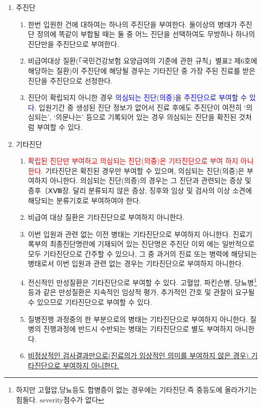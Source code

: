 \begin{tcolorbox}[frogbox,title=주진단과 기타진단에 대한이해]
\begin{enumerate}[가.]\tightlist
\item 주진단
	\begin{enumerate}[(1)]\tightlist
	\item 한번 입원한 건에 대하여는 하나의 주진단을 부여한다. 둘이상의 병태가 주진단 정의에 똑같이 부합될 때는 둘 중 어느 진단을 선택하여도 무방하나 하나의 진단만을 주진단으로 부여한다.
	\item 비급여대상 질환(「국민건강보험 요양급여의 기준에 관한 규칙」별표2 제6호에 해당하는 질환)이 주진단에 해당될 경우는 기타진단 중 가장 주된 진료를 받은 진단을 주진단으로 선정한다.
	\item 진단이 확립되지 아니한 경우 \textcolor{blue}{의심되는 진단(의증)을 주진단으로 부여할 수 있다.} 입원기간 중 생성된 진단 정보가 없어서 진료 후에도 주진단이 여전히 ‘의심되는’, ‘의문나는’ 등으로 기록되어 있는 경우 의심되는 진단을 확진된 것처럼 부여할 수 있다.
	\end{enumerate}
\item 기타진단
\begin{enumerate}[(1)]\tightlist
\item \textcolor{red}{확립된 진단만 부여하고 의심되는 진단(의증)은 기타진단으로 부여 하지 아니한다.} 기타진단은 확진된 경우만 부여할 수 있으며, 의심되는 진단(의증)은 부여하지 아니한다. 의심되는 진단(의증)의 경우는 그 진단과 관련되는 증상 및 증후〔ⅩⅧ장. 달리 분류되지 않은 증상, 징후와 임상 및 검사의 이상 소견에 해당되는 분류기호로 부여하여야 한다.
\item 비급여 대상 질환은 기타진단으로 부여하지 아니한다.
\item 이번 입원과 관련 없는 이전 병태는 기타진단으로 부여하지 아니한다. 진료기록부의 최종진단명란에 기재되어 있는 진단명은 주진단 이외 에는 일반적으로 모두 기타진단으로 간주할 수 있으나, 그 중 과거의 진료 또는 병력에 해당되는 병태로서 이번 입원과 관련 없는 경우는 기타진단으로 부여하지 아니한다.
\item 전신적인 만성질환은 기타진단으로 부여할 수 있다. 고혈압, 파킨슨병, 당뇨병\footnote{하지만 고혈압,당뇨등도 합병증이 없는 경우에는 기타진단.즉 중등도에 올라가기는 힘들다. severity점수가 없다} 등과 같은 만성질환은 지속적인 임상적 평가, 추가적인 간호 및 관찰이 요구될 수 있으므로 기타진단으로 부여할 수 있다.
\item 질병진행 과정중의 한 부분으로의 병태는 기타진단으로 부여하지 아니한다. 질병의 진행과정에 반드시 수반되는 병태는 기타진단으로 별도 부여하지 아니한다.
\item \uline{비정상적인 검사결과만으로(진료의가 임상적인 의미를 부여하지 않은 경우) 기타진단으로 부여하지 아니한다.}
\end{enumerate}
\end{enumerate}
\end{tcolorbox}
\prezi{\clearpage}

